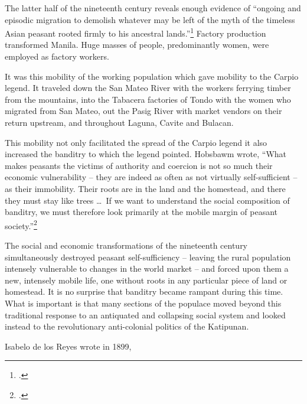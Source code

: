 The latter half of the nineteenth century reveals enough evidence of \enquote{ongoing and episodic migration to demolish whatever may be left of the myth of the timeless Asian peasant rooted firmly to his ancestral lands.}\footcite[10]{Doeppers1998} Factory production transformed Manila. Huge masses of people, predominantly women, were employed as factory workers.

It was this mobility of the working population which gave mobility to the Carpio legend. It traveled down the San Mateo River with the workers ferrying timber from the mountains, into the Tabacera factories of Tondo with the women who migrated from San Mateo, out the Pasig River with market vendors on their return upstream, and throughout Laguna, Cavite and Bulacan.

This mobility not only facilitated the spread of the Carpio legend it also increased the banditry to which the legend pointed. Hobsbawm wrote, \enquote{What makes peasants the victims of authority and coercion is not so much their economic vulnerability -- they are indeed as often as not virtually self-sufficient -- as their immobility. Their roots are in the land and the homestead, and there they must stay like trees \ldots\ If we want to understand the social composition of banditry, we must therefore look primarily at the mobile margin of peasant society.}\footcite[34-5]{Hobsbawm2000} 

The social and economic transformations of the nineteenth century simultaneously destroyed peasant self-sufficiency -- leaving the rural population intensely vulnerable to changes in the world market -- and forced upon them a new, intensely mobile life, one without roots in any particular piece of land or homestead. It is no surprise that banditry became rampant during this time. What is important is that many sections of the populace moved beyond this traditional response to an antiquated and collapsing social system and looked instead to the revolutionary anti-colonial politics of the Katipunan.

Isabelo de los Reyes wrote in 1899, 

